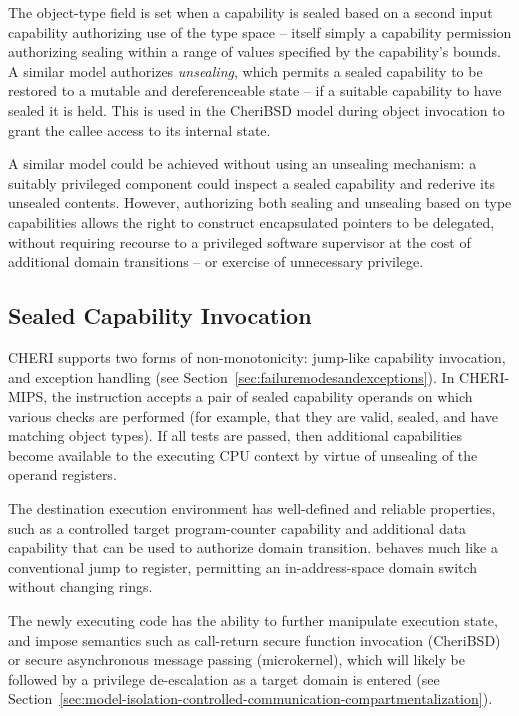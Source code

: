 The object-type field is set when a capability is sealed based on a second
input capability authorizing use of the type space -- itself simply a
capability permission authorizing sealing within a range of values specified
by the capability's bounds.
A similar model authorizes \textit{unsealing}, which permits a sealed
capability to be restored to a mutable and dereferenceable state -- if a
suitable capability to have sealed it is held.
This is used in the CheriBSD model during object invocation to grant the
callee access to its internal state.

A similar model could be achieved without using an unsealing mechanism: a
suitably privileged component could inspect a sealed capability and rederive
its unsealed contents.
However, authorizing both sealing and unsealing based on type capabilities
allows the right to construct encapsulated pointers to be delegated, without
requiring recourse to a privileged software supervisor at the cost of
additional domain transitions -- or exercise of unnecessary privilege.

\subsection{Sealed Capability Invocation}
\label{sec:model-sealed-capability-invocation}

CHERI supports two forms of non-monotonicity: jump-like capability invocation,
and exception handling (see Section~\ref{sec:failuremodesandexceptions}).
In CHERI-MIPS, the  instruction accepts a pair of sealed
capability operands on which various checks are performed (for example, that
they are valid, sealed, and have matching object types).
If all tests are passed, then additional capabilities become available to the
executing CPU context by virtue of unsealing of the operand
registers.

The destination execution environment has well-defined and
reliable properties, such as a controlled target program-counter capability
and additional data capability that can be used to authorize domain
transition.
 behaves much like a conventional jump to register, permitting an
in-address-space domain switch without changing rings.

The newly executing code has the ability to further manipulate
execution state, and impose semantics such as call-return secure function
invocation (CheriBSD) or secure asynchronous message passing (microkernel),
which will likely be followed by a privilege de-escalation as a target domain
is entered (see
Section~\ref{sec:model-isolation-controlled-communication-compartmentalization}).

